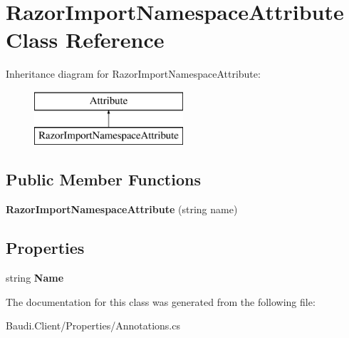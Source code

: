 \hypertarget{class_razor_import_namespace_attribute}{}\section{Razor\+Import\+Namespace\+Attribute Class Reference}
\label{class_razor_import_namespace_attribute}
Inheritance diagram for Razor\+Import\+Namespace\+Attribute\+:\begin{figure}[H]
\begin{center}
\leavevmode
\includegraphics[height=2.000000cm]{class_razor_import_namespace_attribute}
\end{center}
\end{figure}
\subsection*{Public Member Functions}
\begin{DoxyCompactItemize}
\item 
\hypertarget{class_razor_import_namespace_attribute_ab0da268448da74efb48a051a661ecb1e}{}{\bfseries Razor\+Import\+Namespace\+Attribute} (string name)\label{class_razor_import_namespace_attribute_ab0da268448da74efb48a051a661ecb1e}

\end{DoxyCompactItemize}
\subsection*{Properties}
\begin{DoxyCompactItemize}
\item 
\hypertarget{class_razor_import_namespace_attribute_a9416e58cf9013104dd4d22007c417a89}{}string {\bfseries Name}\label{class_razor_import_namespace_attribute_a9416e58cf9013104dd4d22007c417a89}

\end{DoxyCompactItemize}


The documentation for this class was generated from the following file\+:\begin{DoxyCompactItemize}
\item 
Baudi.\+Client/\+Properties/Annotations.\+cs\end{DoxyCompactItemize}
